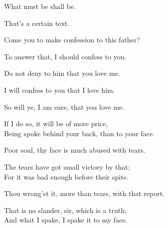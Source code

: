 \begin{speech}
What must be shall be. \\
\end{speech}
\begin{speech}
That's a certain text. \\
\end{speech}
\begin{speech}
Come you to make confession to this father? \\
\end{speech}
\begin{speech}
To answer that, I should confess to you. \\
\end{speech}
\begin{speech}
Do not deny to him that you love me. \\
\end{speech}
\begin{speech}
I will confess to you that I love him. \\
\end{speech}
\begin{speech}
So will ye, I am sure, that you love me. \\
\end{speech}
\begin{speech}
If I do so, it will be of more price, \\
Being spoke behind your back, than to your face. \\
\end{speech}
\begin{speech}
Poor soul, thy face is much abused with tears. \\

\end{speech}
\begin{speech}
The tears have got small victory by that; \\
For it was bad enough before their spite. \\
\end{speech}
\begin{speech}
Thou wrong'st it, more than tears, with that report.
\\
\end{speech}
\begin{speech}
That is no slander, sir, which is a truth; \\
And what I spake, I spake it to my face. \\
\end{speech}
